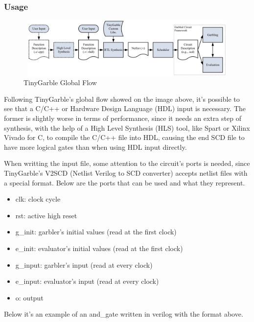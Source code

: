 \begin{refsection}
\newpage

\subsubsection{Usage}

\begin{figure}[H]
	\centering
	\includegraphics[width=1\textwidth, height=3cm]{./sdf/secure_multiparty_computation/figures/tiny_garble_flow.png}
    \caption{TinyGarble Global Flow\cite{Songhori}}\label{fig:tinygarble_flow}
\end{figure}

Following TinyGarble's global flow showed on the image above, it's possible to see that a C/C++ or Hardware Design Language (HDL) input is necessary. The former is slightly worse in terms of performance, since it needs an extra step of synthesis, with the help of a High Level Synthesis (HLS) tool, like Spart or Xilinx Vivado for C, to compile the C/C++ file into HDL, causing the end SCD file to have more logical gates than when using HDL input directly.

When writting the input file, some attention to the circuit's ports is needed, since TinyGarble's V2SCD (Netlist Verilog to SCD converter) accepts netlist files with a special format. 
Below are the ports that can be used and what they represent.

\begin{itemize}  
\item clk: clock cycle
\item rst: active high reset
\item g\_init: garbler's initial values (read at the first clock)
\item e\_init: evaluator's initial values (read at the first clock)
\item g\_input: garbler's input (read at every clock)
\item e\_input: evaluator's input (read at every clock)
\item o: output
\end{itemize}

Below it's an example of an and\_gate written in verilog with the format above.


\end{refsection}
